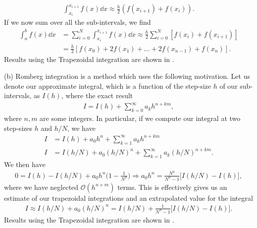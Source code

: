 {\begin{align}
    \int_{x_{i}}^{x_{i+1}} f(x) \dd{x} \approx \frac{h}{2} ( f(x_{i+1}) + f(x_{i}) )
.\end{align}
If we now sum over all the sub-intervals, we find
\begin{align}
    \int_{a}^{b} f(x) \dd{x} &= \sum_{i=0}^{N} \int_{x_{i}}^{x_{i+1}} f(x) \dd{x} \approx \frac{h}{2} \sum_{i=0}^{N} [ f(x_{i}) + f(x_{i+1}) ] \nonumber \\
                             &= \frac{h}{2}[ f(x_{0}) + 2 f(x_{1}) + \ldots + 2 f(x_{n-1}) + f(x_{n}) ]
.\end{align}
Results using the Trapezoidal integration are shown in .


(b) Romberg integration is a method which uses the following motivation.
Let us denote our approximate integral, which is a function of the step-size $h$ of our sub-intervals, as $I(h)$, where the exact result
\begin{align}
    I = I(h) + \sum_{k=0}^{\infty} a_{k} h^{n+km}
,\end{align}
where $n,m$ are some integers.
In particular, if we compute our integral at two step-sizes $h$ and $h/N$, we have
\begin{align}
    I &= I(h) + a_0 h^{n} + \sum_{k=1}^{\infty} a_{k} h^{n+km} \\
    I &= I(h/N) + a_0 (h/N)^{n} + \sum_{k=1}^{\infty} a_{k} (h/N)^{n+km}
.\end{align}
We then have
\begin{align}
    0 = I(h) - I(h/N) + a_0 h^{n} \Big( 1 - \frac{1}{N^{n}} \Big) \Rightarrow a_0 h^{n} = \frac{N^{n}}{N^{n} - 1} \Big[ I(h/N) - I(h) \Big]
,\end{align}
where we have neglected $\mathcal{O}(h^{n+m})$ terms.
This is effectively gives us an estimate of our trapezoidal integrations and an extrapolated value for the integral
\begin{align}
    I \approx I(h/N) + a_0 (h/N)^{n} = I(h/N) + \frac{1}{N^{n} - 1} \Big[ I(h/N) - I(h) \Big]
.\end{align}
Results using the Trapezoidal integration are shown in .


}
